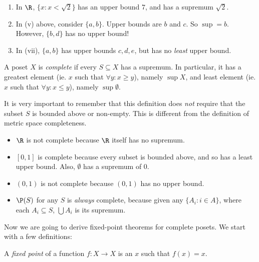 \documentclass[a4paper]{article}
\begin{document}
\begin{eg}\leavevmode
  \begin{enumerate}
    \item In $\R$, $\{x: x < \sqrt{2}\}$ has an upper bound $7$, and has a supremum $\sqrt{2}$.

    \item In (v) above, consider $\{a, b\}$. Upper bounds are $b$ and $c$. So $\sup = b$. However, $\{b, d\}$ has no upper bound!
    \item In (vii), $\{a, b\}$ has upper bounds $c, d, e$, but has no \emph{least} upper bound.
  \end{enumerate}
\end{eg}

\begin{defi}
  A poset $X$ is \emph{complete} if every $S\subseteq X$ has a supremum. In particular, it has a greatest element (ie. $x$ such that $\forall y: x \geq y$), namely $\sup X$, and least element (ie. $x$ such that $\forall y: x \leq y$), namely $\sup \emptyset$.
\end{defi}
It is very important to remember that this definition does \emph{not} require that the subset $S$ is bounded above or non-empty. This is different from the definition of metric space completeness.

\begin{eg}\leavevmode
  \begin{itemize}
    \item $\R$ is not complete because $\R$ itself has no supremum.
    \item $[0, 1]$ is complete because every subset is bounded above, and so has a least upper bound. Also, $\emptyset$ has a supremum of $0$.
    \item $(0, 1)$ is not complete because $(0, 1)$ has no upper bound.
    \item $\P(S)$ for any $S$ is \emph{always} complete, because given any $\{A_i: i\in A\}$, where each $A_i\subseteq S$, $\bigcup A_i$ is its supremum.
  \end{itemize}
\end{eg}

Now we are going to derive fixed-point theorems for complete posets. We start with a few definitions:

\begin{defi}
  A \emph{fixed point} of a function $f:X\to X$ is an $x$ such that $f(x) = x$.
\end{defi}
\end{document}
